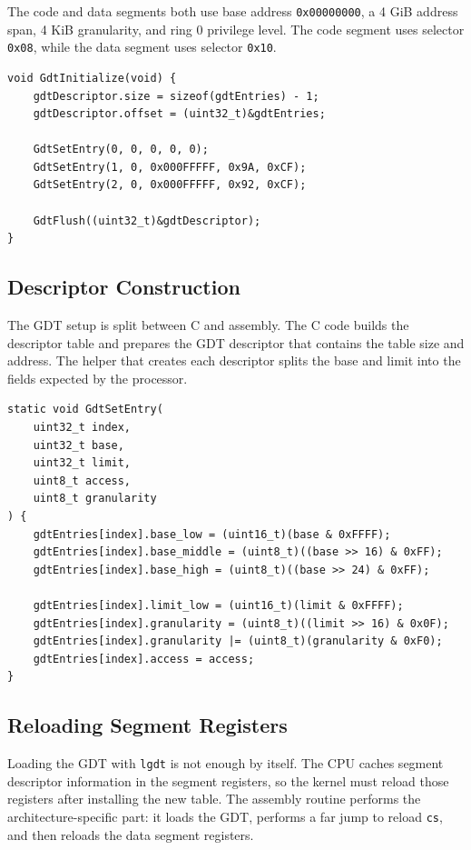 The code and data segments both use base address \texttt{0x00000000}, a 4 GiB address span, 4 KiB granularity, and ring 0 privilege level. The code segment uses selector \texttt{0x08}, while the data segment uses selector \texttt{0x10}.

\begin{listing}[H]
\begin{verbatim}
void GdtInitialize(void) {
    gdtDescriptor.size = sizeof(gdtEntries) - 1;
    gdtDescriptor.offset = (uint32_t)&gdtEntries;

    GdtSetEntry(0, 0, 0, 0, 0);
    GdtSetEntry(1, 0, 0x000FFFFF, 0x9A, 0xCF);
    GdtSetEntry(2, 0, 0x000FFFFF, 0x92, 0xCF);

    GdtFlush((uint32_t)&gdtDescriptor);
}
\end{verbatim}
\caption{Minimal GDT initialization with null, kernel code, and kernel data descriptors.}
\end{listing}

\subsection{Descriptor Construction}
The GDT setup is split between C and assembly. The C code builds the descriptor table and prepares the GDT descriptor that contains the table size and address. The helper that creates each descriptor splits the base and limit into the fields expected by the processor.

\begin{listing}[H]
\begin{verbatim}
static void GdtSetEntry(
    uint32_t index,
    uint32_t base,
    uint32_t limit,
    uint8_t access,
    uint8_t granularity
) {
    gdtEntries[index].base_low = (uint16_t)(base & 0xFFFF);
    gdtEntries[index].base_middle = (uint8_t)((base >> 16) & 0xFF);
    gdtEntries[index].base_high = (uint8_t)((base >> 24) & 0xFF);

    gdtEntries[index].limit_low = (uint16_t)(limit & 0xFFFF);
    gdtEntries[index].granularity = (uint8_t)((limit >> 16) & 0x0F);
    gdtEntries[index].granularity |= (uint8_t)(granularity & 0xF0);
    gdtEntries[index].access = access;
}
\end{verbatim}
\caption{Building an x86 GDT descriptor from base, limit, access, and granularity fields.}
\end{listing}
\clearpage

\subsection{Reloading Segment Registers}
Loading the GDT with \texttt{lgdt} is not enough by itself. The CPU caches segment descriptor information in the segment registers, so the kernel must reload those registers after installing the new table. The assembly routine performs the architecture-specific part: it loads the GDT, performs a far jump to reload \texttt{cs}, and then reloads the data segment registers.

